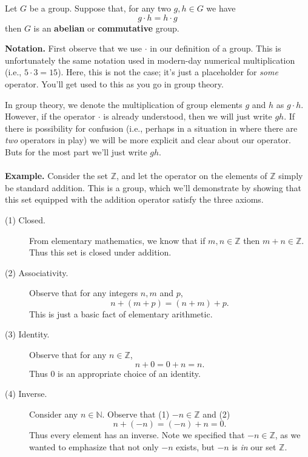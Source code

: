 \documentclass[12pt,letterpaper]{algebra_book}
\theoremstyle{definition}
\begin{document}
\begin{definition}
    Let $G$ be a group. Suppose that, for any two $g, h \in G$
    we have 
    \[
        g \cdot h = h \cdot g  
    \]
    then $G$ is an \textbf{abelian} or \textbf{commutative} group.
\end{definition}

\textbf{Notation.} 
First observe that we use $\cdot$ in our definition of a group. This
is unfortunately the same notation used in modern-day numerical
multiplication (i.e., $5 \cdot 3 = 15$). Here, this is not the case;
it's just a placeholder for \textit{some} operator. You'll get used
to this as you go in group theory.

In group theory, we denote the multiplication of
group elements $g$ and $h$ as $g \cdot h$. However, if the operator
$\cdot$ is already understood, then we will just write $gh$. If there
is possibility for confusion (i.e., perhaps in a situation in where
there are \textit{two} operators in play) we will be more explicit and
clear about our operator. Buts for the most part we'll just write $gh$.
\\
\\
\noindent
\textbf{Example.} Consider the set $\mathbb{Z}$, and let the operator
on the elements of $\mathbb{Z}$ simply be standard addition. This is a
group, which we'll demonstrate by showing that this set equipped with
the addition operator
satisfy the three axioms.
\begin{description}
    \item[(1) Closed.] From elementary mathematics, we know that if
    $m, n \in \mathbb{Z}$ then $m + n \in \mathbb{Z}$. Thus this set
    is closed under addition.

    \item[(2) Associativity.] Observe that for any integers $n, m $
    and $p$, 
    \[
        n + (m + p) = (n + m) + p.
    \]
    This is just a basic fact of elementary arithmetic.

    \item[(3) Identity.] Observe that for any $n \in \mathbb{Z}$, 
    \[
        n + 0 = 0 + n = n.        
    \]
    Thus 0 is an appropriate choice of an identity. 

    \item[(4) Inverse.] Consider any $n \in \mathbb{N}$. Observe that 
    (1) $-n \in \mathbb{Z}$ and (2) 
    \[
        n + (-n) = (-n) + n = 0.
    \] 
    Thus every element has an inverse. Note we specified that $-n \in
    \mathbb{Z}$, as we wanted to emphasize that not only $-n$ exists,
    but $-n$ is \textit{in} our set $\mathbb{Z}$.    

\end{description}
\end{document}
